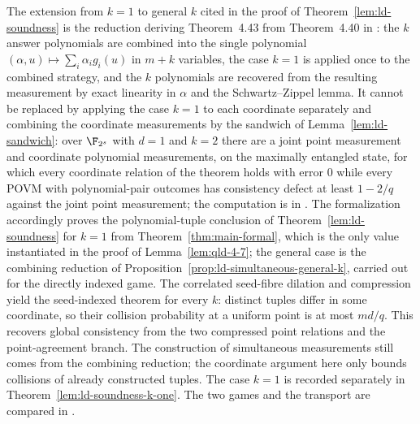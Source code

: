 \begin{remark}\label{rem:ld-soundness-simultaneity}
	The extension from $k = 1$ to general $k$ cited in the proof of Theorem~\ref{lem:ld-soundness} is the reduction deriving Theorem~4.43 from Theorem~4.40 in \cite{Natarajan2018NEEXP}: the $k$ answer polynomials are combined into the single polynomial $(\alpha, u) \mapsto \sum_i \alpha_i g_i(u)$ in $m + k$ variables, the case $k = 1$ is applied once to the combined strategy, and the $k$ polynomials are recovered from the resulting measurement by exact linearity in $\alpha$ and the Schwartz--Zippel lemma. It cannot be replaced by applying the case $k = 1$ to each coordinate separately and combining the coordinate measurements by the sandwich of Lemma~\ref{lem:ld-sandwich}: over $\F_{2^s}$ with $d = 1$ and $k = 2$ there are a joint point measurement and coordinate polynomial measurements, on the maximally entangled state, for which every coordinate relation of the theorem holds with error $0$ while every POVM with polynomial-pair outcomes has consistency defect at least $1 - 2/q$ against the joint point measurement; the computation is in \cite{gap:qpbt_ld-simultaneous-sandwich}. The formalization accordingly proves the polynomial-tuple conclusion of Theorem~\ref{lem:ld-soundness} for $k = 1$ from Theorem~\ref{thm:main-formal}, which is the only value instantiated in the proof of Lemma~\ref{lem:qld-4-7}; the general case is the combining reduction of Proposition~\ref{prop:ld-simultaneous-general-k}, carried out for the directly indexed game. The correlated seed-fibre dilation and compression yield the seed-indexed theorem for every $k$: distinct tuples differ in some coordinate, so their collision probability at a uniform point is at most $md/q$. This recovers global consistency from the two compressed point relations and the point-agreement branch. The construction of simultaneous measurements still comes from the combining reduction; the coordinate argument here only bounds collisions of already constructed tuples. The case $k = 1$ is recorded separately in Theorem~\ref{lem:ld-soundness-k-one}. The two games and the transport are compared in \cite{gap:qpbt_ld-dimension-divisibility}.
\end{remark}

